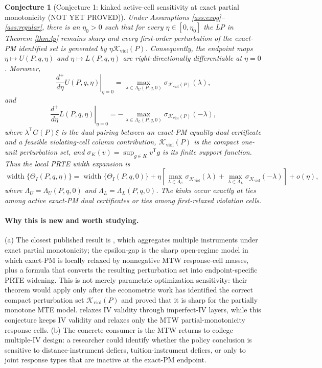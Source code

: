\documentclass[11pt]{article}
\newcommand{\transpose}{\mathsf{T}}
\theoremstyle{definition}
\theoremstyle{plain}
\newtheorem{conjecture}{Conjecture}
\theoremstyle{remark}
\begin{document}
\begin{conjecture}[Conjecture 1: kinked active-cell sensitivity at exact partial monotonicity (NOT YET PROVED)]\label{conj:kink}
Under Assumptions \ref{ass:exog}--\ref{ass:regular}, there is an \(\eta_0>0\) such that for every \(\eta\in[0,\eta_0]\) the LP in Theorem \ref{thm:lp} remains sharp and every first-order perturbation of the exact-PM identified set is generated by \(\eta\mathcal K_{\mathrm{viol}}(P)\).  Consequently, the endpoint maps \(\eta\mapsto U(P,q,\eta)\) and \(\eta\mapsto L(P,q,\eta)\) are right-directionally differentiable at \(\eta=0\).  Moreover,
\[
\left.\frac{d^+}{d\eta}U(P,q,\eta)\right|_{\eta=0}
=\max_{\lambda\in\Lambda_U(P,q,0)}\sigma_{\mathcal K_{\mathrm{viol}}(P)}(\lambda),
\]
and
\[
\left.\frac{d^+}{d\eta}L(P,q,\eta)\right|_{\eta=0}
=-\max_{\lambda\in\Lambda_L(P,q,0)}\sigma_{\mathcal K_{\mathrm{viol}}(P)}(-\lambda),
\]
where \(\lambda^\transpose G(P)\xi\) is the dual pairing between an exact-PM equality-dual certificate and a feasible violating-cell column contribution, \(\mathcal K_{\mathrm{viol}}(P)\) is the compact one-unit perturbation set, and \(\sigma_K(v)=\sup_{g\in K}v^\transpose g\) is its finite support function.  Thus the local PRTE width expansion is
\[
\operatorname{width}\{\Theta_I(P,q,\eta)\}
=\operatorname{width}\{\Theta_I(P,q,0)\}
+
\eta\left[
\max_{\lambda\in\Lambda_U}\sigma_{\mathcal K_{\mathrm{viol}}}(\lambda)
+
\max_{\lambda\in\Lambda_L}\sigma_{\mathcal K_{\mathrm{viol}}}(-\lambda)
\right]+o(\eta),
\]
where \(\Lambda_U=\Lambda_U(P,q,0)\) and \(\Lambda_L=\Lambda_L(P,q,0)\).  The kinks occur exactly at ties among active exact-PM dual certificates or ties among first-relaxed violation cells.
\end{conjecture}
\paragraph{Why this is new and worth studying.}
(a) The closest published result is \citet{MogstadTorgovitskyWalters2024}, which aggregates multiple instruments under exact partial monotonicity; the epsilon-gap is the sharp open-regime model in which exact-PM is locally relaxed by nonnegative MTW response-cell masses, plus a formula that converts the resulting perturbation set into endpoint-specific PRTE widening.  This is not merely \citet{BonnansShapiro2000} parametric optimization sensitivity: their theorem would apply only after the econometric work has identified the correct compact perturbation set \(\mathcal K_{\mathrm{viol}}(P)\) and proved that it is sharp for the partially monotone MTE model.  \citet{MourifieWan2025} relaxes IV validity through imperfect-IV layers, while this conjecture keeps IV validity and relaxes only the MTW partial-monotonicity response cells.  (b) The concrete consumer is the MTW returns-to-college multiple-IV design: a researcher could identify whether the policy conclusion is sensitive to distance-instrument defiers, tuition-instrument defiers, or only to joint response types that are inactive at the exact-PM endpoint.
\end{document}
